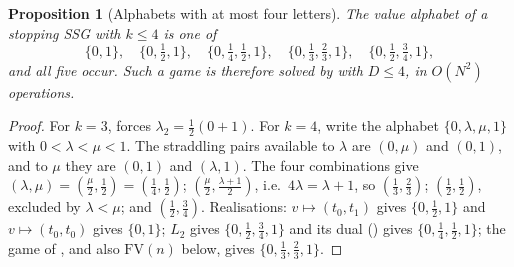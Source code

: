 \documentclass[11pt]{article}
\theoremstyle{plain}
\newtheorem{proposition}[theorem]{Proposition}
\theoremstyle{definition}
\begin{document}
\begin{proposition}[Alphabets with at most four letters]\label{prop:alphabet-four}
The value alphabet of a stopping SSG with $k\le4$ is one of
\[
  \{0,1\},\quad\{0,\tfrac12,1\},\quad\{0,\tfrac14,\tfrac12,1\},\quad
  \{0,\tfrac13,\tfrac23,1\},\quad\{0,\tfrac12,\tfrac34,1\},
\]
and all five occur. Such a game is therefore solved by
 with $D\le4$, in $O(N^{2})$ operations.
\end{proposition}

\begin{proof}
For $k=3$,  forces $\lambda_2=\tfrac12(0+1)$.
For $k=4$, write the alphabet $\{0,\lambda,\mu,1\}$ with $0<\lambda<\mu<1$.
The straddling pairs available to $\lambda$ are $(0,\mu)$ and $(0,1)$, and
to $\mu$ they are $(0,1)$ and $(\lambda,1)$. The four combinations give
$(\lambda,\mu)=(\tfrac\mu2,\tfrac12)=(\tfrac14,\tfrac12)$;
$(\tfrac\mu2,\tfrac{\lambda+1}2)$, i.e.\ $4\lambda=\lambda+1$, so
$(\tfrac13,\tfrac23)$; $(\tfrac12,\tfrac12)$, excluded by
$\lambda<\mu$; and $(\tfrac12,\tfrac34)$. Realisations: $v\mapsto(t_0,t_1)$
gives $\{0,\tfrac12,1\}$ and $v\mapsto(t_0,t_0)$ gives $\{0,1\}$;
$L_2$ gives $\{0,\tfrac12,\tfrac34,1\}$ and its dual ()
gives $\{0,\tfrac14,\tfrac12,1\}$; the game of ,
and also $\mathrm{FV}(n)$ below, gives $\{0,\tfrac13,\tfrac23,1\}$.
\end{proof}
\end{document}
